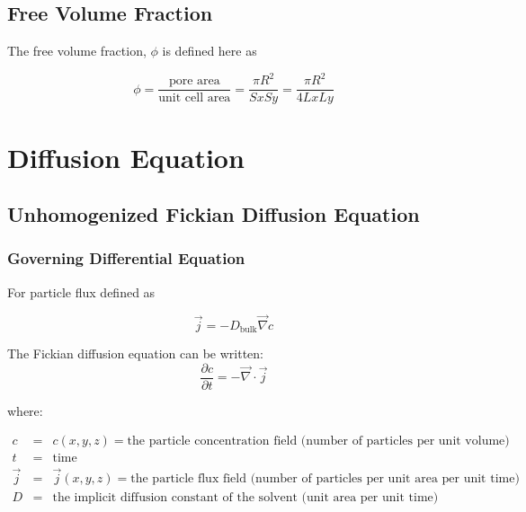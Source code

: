 \documentclass{article}
\begin{document}
\subsection{Free Volume Fraction}\label{subsec:volfrac}

The free volume fraction, $\phi$ is defined here as

\begin{equation}
\phi = \frac{\text{pore area}}{\text{unit cell area}}
= \frac{\pi R^2}{Sx Sy} = \frac{\pi R^2}{4 Lx Ly}
\end{equation}

\section{Diffusion Equation}\label{sec:equation}

\subsection{Unhomogenized Fickian Diffusion Equation}\label{subsec:unhom_fick}

\subsubsection{Governing Differential Equation}\label{subsubsec:unhom_fick_gov}
For particle flux defined as 

\begin{equation}
\vec{j} = - D_{\mathrm{bulk}} \vec{\nabla} c
\end{equation}

The Fickian diffusion equation can be written:
\begin{equation}
\frac{\partial c}{\partial t} = - \vec{\nabla} \cdot \vec{j}
\end{equation}

where:

$\begin{array}{rcl}
c & = & c(x,y,z) = \text{the particle concentration field (number of particles per unit volume)} \\
t & = & \text{time} \\
\vec{j} & = & \vec{j}(x,y,z) = \text{the particle flux field (number of particles per unit area per unit time)} \\
D & = & \text{the implicit diffusion constant of the solvent (unit area per unit time)}
\end{array}$
\end{document}
